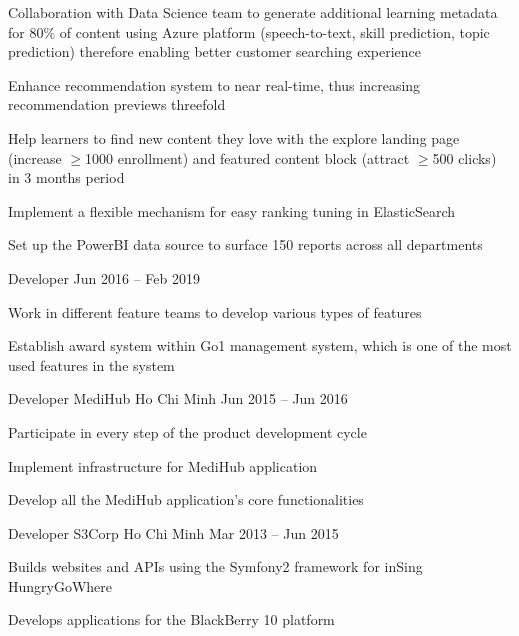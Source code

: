 \documentclass[]{awesome-cv}
\begin{document}
\begin{cventries}
{\begin{cvitems}
		\item {Collaboration with Data Science team to generate additional learning metadata for 80\% of content using Azure platform (speech-to-text, skill prediction, topic prediction) therefore enabling better customer searching experience}
		\item {Enhance recommendation system to near real-time, thus increasing recommendation previews threefold}
		\item {Help learners to find new content they love with the explore landing page (increase $\geq$1000 enrollment) and featured content block (attract $\geq$500 clicks) in 3 months period}
		\item {Implement a flexible mechanism for easy ranking tuning in ElasticSearch}
		\item {Set up the PowerBI data source to surface 150 reports across all departments}
		\end{cvitems}}
	\cventry
	{Developer}
	{}
	{}
	{Jun 2016 – Feb 2019}
	{\begin{cvitems}
		\item {Work in different feature teams to develop various types of features}
		\item {Establish award system within Go1 management system, which is one of the most used features in the system}
		\end{cvitems}}
	\cventry
	{Developer}
	{MediHub}
	{Ho Chi Minh}
	{Jun 2015 – Jun 2016}
	{\begin{cvitems}
		\item {Participate in every step of the product development cycle}
		\item {Implement infrastructure for MediHub application}
		\item {Develop all the MediHub application's core functionalities}
		\end{cvitems}}
	\cventry
	{Developer}
	{S3Corp}
	{Ho Chi Minh}
	{Mar 2013 – Jun 2015}
	{
		\begin{cvitems}
			\item {Builds websites and APIs using the Symfony2 framework for inSing HungryGoWhere}
			\item {Develops applications for the BlackBerry 10 platform}
		\end{cvitems}
	}
\end{cventries}
\end{document}
